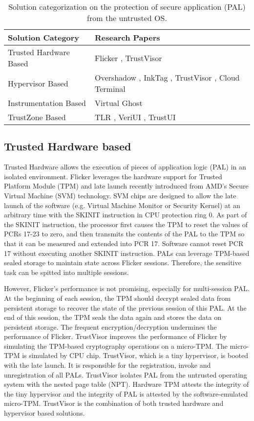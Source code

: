 \begin{table*}[ht]
	\centering
	\begin{tabular}{|l|l|}
		\hline
		\textbf{Solution Category}      & \textbf{Research Papers} \\ \hline
		Trusted Hardware Based & Flicker \cite{Flicker}, TrustVisor \cite{TrustVisor} \\ \hline
		Hypervisor Based       & Overshadow \cite{Overshadow}, InkTag \cite{InkTag}, TrustVisor \cite{TrustVisor}, Cloud Terminal \cite{CloudTerminal}\\ \hline
		Instrumentation Based  & Virtual Ghost \cite{VirtualGhost}\\ \hline
		TrustZone Based        & TLR \cite{TLR}, VeriUI \cite{VeriUI}, TrustUI \cite{TrustUI}\\ \hline
	\end{tabular}
	\caption{Solution categorization on the protection of secure application
	(PAL) from the untrusted OS.}
	\label{table:problem1}
\end{table*}

\subsection{Trusted Hardware based}

Trusted Hardware allows the execution of pieces of application logic (PAL) in
an isolated environment. Flicker \cite{Flicker} leverages the hardware support
for Trusted Platform Module (TPM) \cite{TPM} and late launch recently
introduced from AMD's Secure Virtual Machine (SVM) technology. SVM chips are
designed to allow the late launch of the software (e.g. Virtual Machine Monitor
or Security Kernel) at an arbitrary time with the SKINIT instruction in CPU
protection ring 0. As part of the SKINIT instruction, the processor first
causes the TPM to reset the values of PCRs 17-23 to zero, and then transmits
the contents of the PAL to the TPM so that it can be measured and extended into
PCR 17. Software cannot reset PCR 17 without executing another SKINIT
instruction. PALs can leverage TPM-based sealed storage to maintain state
across Flicker sessions. Therefore, the sensitive task can be spitted into
multiple sessions.

However, Flicker's performance is not promising, especially for multi-session
PAL. At the beginning of each session, the TPM should decrypt sealed data from
persistent storage to recover the state of the previous session of this PAL. At
the end of this session, the TPM seals the data again and stores the data on
persistent storage. The frequent encryption/decryption undermines the
performance of Flicker. TrustVisor \cite{TrustVisor} improves the performance
of Flicker by simulating the TPM-based cryptography operations on a micro-TPM.
The micro-TPM is simulated by CPU chip. TrustVisor, which is a tiny hypervisor,
is booted with the late launch. It is responsible for the registration, invoke
and unregistration of all PALs.  TrustVisor isolates PAL from the untrusted
operating system with the nested page table (NPT). Hardware TPM attests the
integrity of the tiny hypervisor and the integrity of PAL is attested by the
software-emulated micro-TPM. TrustVisor is the combination of both trusted
hardware and hypervisor based solutions.

